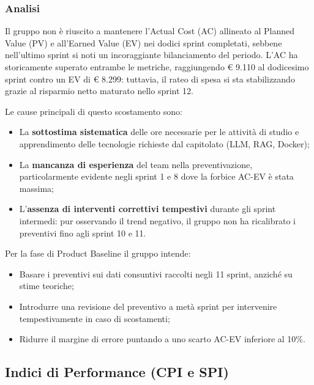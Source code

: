 \documentclass[a4paper,11pt,oneside]{scrartcl}
\begin{document}
\subsubsection*{Analisi}

Il gruppo non è riuscito a mantenere l'Actual Cost (AC) allineato al Planned Value (PV) e all'Earned Value (EV) nei dodici sprint completati, sebbene nell'ultimo sprint si noti un incoraggiante bilanciamento del periodo. L'AC ha storicamente superato entrambe le metriche, raggiungendo \euro{} 9.110 al dodicesimo sprint contro un EV di \euro{} 8.299: tuttavia, il rateo di spesa si sta stabilizzando grazie al risparmio netto maturato nello sprint 12.

Le cause principali di questo scostamento sono:
\begin{itemize}
    \item La \textbf{sottostima sistematica} delle ore necessarie per le attività di studio e apprendimento delle tecnologie richieste dal capitolato (LLM, RAG, Docker);
    \item La \textbf{mancanza di esperienza} del team nella preventivazione, particolarmente evidente negli sprint 1 e 8 dove la forbice AC-EV è stata massima;
    \item L'\textbf{assenza di interventi correttivi tempestivi} durante gli sprint intermedi: pur osservando il trend negativo, il gruppo non ha ricalibrato i preventivi fino agli sprint 10 e 11.
\end{itemize}

Per la fase di Product Baseline il gruppo intende:
\begin{itemize}
    \item Basare i preventivi sui dati consuntivi raccolti negli 11 sprint, anziché su stime teoriche;
    \item Introdurre una revisione del preventivo a metà sprint per intervenire tempestivamente in caso di scostamenti;
    \item Ridurre il margine di errore puntando a uno scarto AC-EV inferiore al 10\%.
\end{itemize}

\subsection{Indici di Performance (CPI e SPI)}
\end{document}
